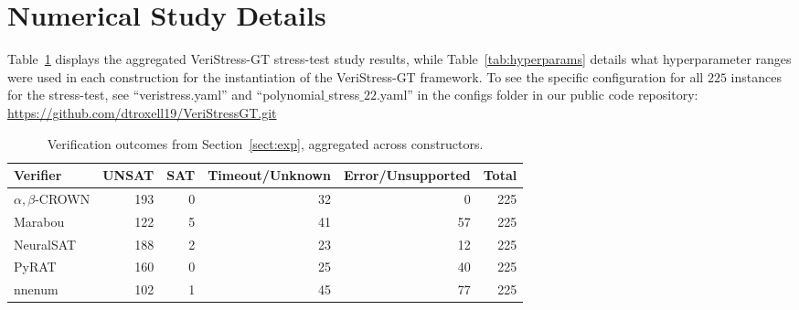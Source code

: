 \documentclass{article}
\theoremstyle{definition}
\begin{document}
\section{Numerical Study Details}\label{app:detail_results}
Table~\ref{tab:verifier_outcomes} displays the aggregated VeriStress-GT stress-test study results, while Table~\ref{tab:hyperparams} details what hyperparameter ranges were used in each construction for the instantiation of the VeriStress-GT framework. To see the specific configuration for all $225$ instances for the stress-test, see ``veristress.yaml'' and ``polynomial$\_$stress$\_22.$yaml'' in the configs folder in our public code repository: \url{https://github.com/dtroxell19/VeriStressGT.git}

\begin{table}[ht]
\centering
\begin{tabular}{lrrrrr}\label{tab:verifier_outcomes}
\textbf{Verifier} & \textbf{UNSAT} & \textbf{SAT} & \textbf{Timeout/Unknown} & \textbf{Error/Unsupported} & \textbf{Total} \\
\hline
$\alpha,\beta$-CROWN   & 193 & 0 & 32 & 0  & 225 \\
Marabou  & 122 & 5 & 41 & 57 & 225 \\
NeuralSAT & 188 & 2 & 23 & 12  & 225 \\
PyRAT     & 160 & 0 & 25 & 40 & 225 \\
nnenum     & 102 & 1 & 45 & 77 & 225 \\
\hline
\end{tabular}
\caption{Verification outcomes from Section~\ref{sect:exp}, aggregated across constructors.}
\label{tab:verifier_outcomes}
\end{table}
\end{document}
